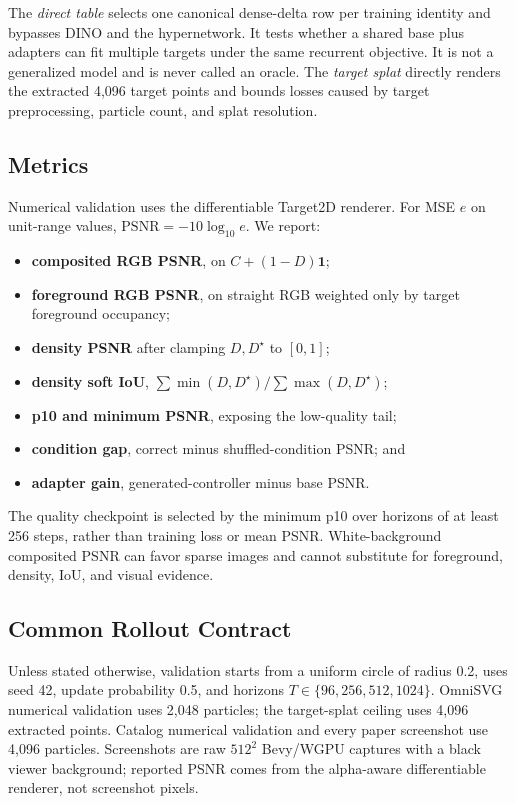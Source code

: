 \documentclass[sigconf,nonacm]{acmart}
\begin{document}
The \emph{direct table} selects one canonical dense-delta row per training
identity and bypasses DINO and the hypernetwork. It tests whether a shared base
plus adapters can fit multiple targets under the same recurrent objective. It
is not a generalized model and is never called an oracle. The \emph{target
splat} directly renders the extracted 4,096 target points and bounds losses
caused by target preprocessing, particle count, and splat resolution.

\subsection{Metrics}

Numerical validation uses the differentiable Target2D renderer. For MSE $e$ on
unit-range values, $\mathrm{PSNR}=-10\log_{10}e$. We report:
\begin{itemize}
  \item \textbf{composited RGB PSNR}, on $C+(1-D)\mathbf{1}$;
  \item \textbf{foreground RGB PSNR}, on straight RGB weighted only by target
  foreground occupancy;
  \item \textbf{density PSNR} after clamping $D,D^\star$ to $[0,1]$;
  \item \textbf{density soft IoU},
  $\sum\min(D,D^\star)/\sum\max(D,D^\star)$;
  \item \textbf{p10 and minimum PSNR}, exposing the low-quality tail;
  \item \textbf{condition gap}, correct minus shuffled-condition PSNR; and
  \item \textbf{adapter gain}, generated-controller minus base PSNR.
\end{itemize}
The quality checkpoint is selected by the minimum p10 over horizons of at
least 256 steps, rather than training loss or mean PSNR. White-background
composited PSNR can favor sparse images and cannot substitute for foreground,
density, IoU, and visual evidence.

\subsection{Common Rollout Contract}

Unless stated otherwise, validation starts from a uniform circle of radius
0.2, uses seed 42, update probability 0.5, and horizons
$T\in\{96,256,512,1024\}$. OmniSVG numerical validation uses 2,048 particles;
the target-splat ceiling uses 4,096 extracted points. Catalog numerical
validation and every paper screenshot use 4,096 particles. Screenshots are
raw $512^2$ Bevy/WGPU captures with a black viewer background; reported PSNR
comes from the alpha-aware differentiable renderer, not screenshot pixels.
\end{document}
